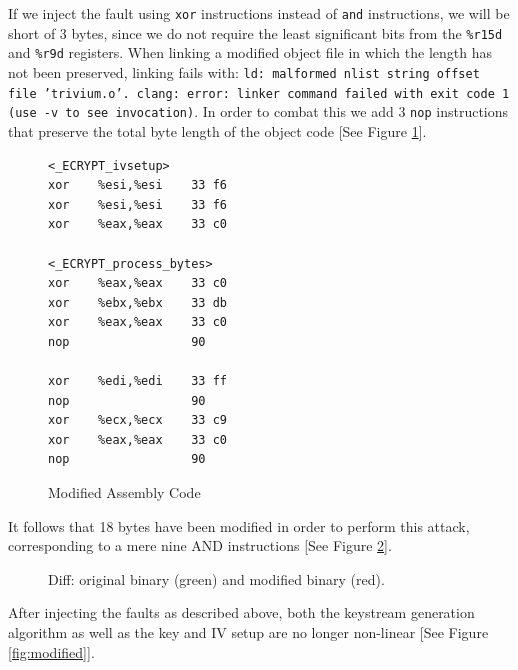 \documentclass[conference]{IEEEtran}
\newcommand{\code}[1]{\texttt{#1}}
\begin{document}
If we inject the fault using \code{xor} instructions instead of \code{and} instructions, we will be short of 3 bytes, since we do not require the least significant bits from the \code{\%r15d} and \code{\%r9d} registers. When linking a modified object file in which the length has not been preserved, linking fails with: \code{ld: malformed nlist string offset file 'trivium.o'. clang: error: linker command failed with exit code 1 (use -v to see invocation)}. In order to combat this we add 3 \code{nop} instructions that preserve the total byte length of the object code [See Figure \ref{fig:mod-asm}].

\begin{figure}[H]
\begin{lstlisting}[style=asm, frame=tlrb]
<_ECRYPT_ivsetup>
xor    %esi,%esi    33 f6
xor    %esi,%esi    33 f6
xor    %eax,%eax    33 c0

<_ECRYPT_process_bytes>
xor    %eax,%eax    33 c0
xor    %ebx,%ebx    33 db 
xor    %eax,%eax    33 c0
nop                 90

xor    %edi,%edi    33 ff
nop                 90
xor    %ecx,%ecx    33 c9
xor    %eax,%eax    33 c0
nop                 90
\end{lstlisting}
\caption{Modified Assembly Code}\label{fig:mod-asm}
\end{figure}

It follows that 18 bytes have been modified in order to perform this attack, corresponding to a mere nine AND instructions [See Figure \ref{fig:diff}].

\begin{figure}[H]
\centering
{}
\caption{Diff: original binary (green) and modified binary (red).}
\label{fig:diff}
\end{figure}

After injecting the faults as described above, both the keystream generation algorithm as well as the key and IV setup are no longer non-linear [See Figure \ref{fig:modified}]. 
\end{document}
